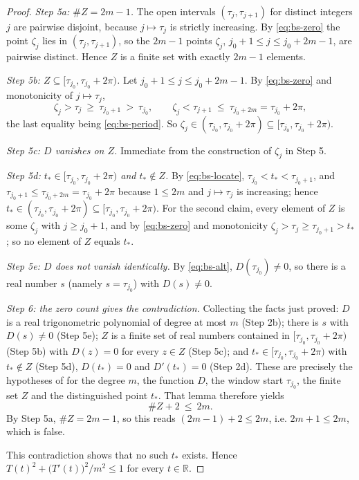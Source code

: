 \begin{proof}
\emph{Step 5a: $\#Z=2m-1$.} The open intervals $(\tau_j,\tau_{j+1})$ for
distinct integers $j$ are pairwise disjoint, because $j\mapsto\tau_j$ is
strictly increasing. By \eqref{eq:bs-zero} the point $\zeta_j$ lies in
$(\tau_j,\tau_{j+1})$, so the $2m-1$ points $\zeta_j$,
$j_0+1\le j\le j_0+2m-1$, are pairwise distinct. Hence $Z$ is a finite set with
exactly $2m-1$ elements.

\emph{Step 5b: $Z\subseteq[\tau_{j_0},\tau_{j_0}+2\pi)$.} Let
$j_0+1\le j\le j_0+2m-1$. By \eqref{eq:bs-zero} and monotonicity of
$j\mapsto\tau_j$,
\[
  \zeta_j>\tau_j\ \ge\ \tau_{j_0+1}\ >\ \tau_{j_0},
  \qquad
  \zeta_j<\tau_{j+1}\ \le\ \tau_{j_0+2m}=\tau_{j_0}+2\pi,
\]
the last equality being \eqref{eq:bs-period}. So
$\zeta_j\in(\tau_{j_0},\tau_{j_0}+2\pi)\subseteq[\tau_{j_0},\tau_{j_0}+2\pi)$.

\emph{Step 5c: $D$ vanishes on $Z$.} Immediate from the construction of
$\zeta_j$ in Step 5.

\emph{Step 5d: $t_*\in[\tau_{j_0},\tau_{j_0}+2\pi)$ and $t_*\notin Z$.} By
\eqref{eq:bs-locate}, $\tau_{j_0}<t_*<\tau_{j_0+1}$, and
$\tau_{j_0+1}\le\tau_{j_0+2m}=\tau_{j_0}+2\pi$ because $1\le 2m$ and
$j\mapsto\tau_j$ is increasing; hence
$t_*\in(\tau_{j_0},\tau_{j_0}+2\pi)\subseteq[\tau_{j_0},\tau_{j_0}+2\pi)$. For
the second claim, every element of $Z$ is some $\zeta_j$ with $j\ge j_0+1$, and
by \eqref{eq:bs-zero} and monotonicity $\zeta_j>\tau_j\ge\tau_{j_0+1}>t_*$; so
no element of $Z$ equals $t_*$.

\emph{Step 5e: $D$ does not vanish identically.} By \eqref{eq:bs-alt},
$D(\tau_{j_0})\ne0$, so there is a real number $s$ (namely $s=\tau_{j_0}$) with
$D(s)\ne0$.

\emph{Step 6: the zero count gives the contradiction.} Collecting the facts
just proved: $D$ is a real trigonometric polynomial of degree at most $m$
(Step 2b); there is $s$ with $D(s)\ne0$ (Step 5e); $Z$ is a finite set of real
numbers contained in $[\tau_{j_0},\tau_{j_0}+2\pi)$ (Step 5b) with $D(z)=0$ for
every $z\in Z$ (Step 5c); and $t_*\in[\tau_{j_0},\tau_{j_0}+2\pi)$ with
$t_*\notin Z$ (Step 5d), $D(t_*)=0$ and $D'(t_*)=0$ (Step 2d). These are
precisely the hypotheses of  for the degree $m$, the
function $D$, the window start $\tau_{j_0}$, the finite set $Z$ and the
distinguished point $t_*$. That lemma therefore yields
\[
  \#Z+2\ \le\ 2m .
\]
By Step 5a, $\#Z=2m-1$, so this reads $(2m-1)+2\le2m$, i.e. $2m+1\le2m$, which
is false.

This contradiction shows that no such $t_*$ exists. Hence
$T(t)^2+\bigl(T'(t)\bigr)^2/m^2\le1$ for every $t\in\mathbb{R}$.
\end{proof}
